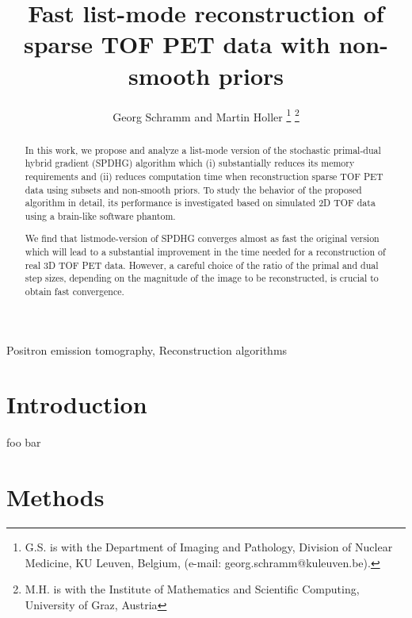 \documentclass{IEEEtran}
\begin{document}
\title{Fast list-mode reconstruction of sparse TOF PET data with non-smooth priors} 
\author{Georg Schramm and Martin Holler
\thanks{G.S. is with the Department of Imaging and Pathology, Division of Nuclear Medicine,
KU Leuven, Belgium, (e-mail: georg.schramm@kuleuven.be).}
\thanks{M.H. is with the Institute of Mathematics and Scientific Computing, 
University of Graz, Austria}
}

\maketitle

\begin{abstract}
In this work, we propose and analyze a list-mode version of the stochastic primal-dual hybrid gradient
(SPDHG) algorithm which (i) substantially reduces its memory requirements and (ii) reduces
computation time when reconstruction sparse TOF PET data using subsets and non-smooth priors. 
To study the behavior of the proposed algorithm in detail, its performance 
is investigated based on simulated 2D TOF data using a brain-like software phantom.

We find that listmode-version of SPDHG converges almost as fast the original version
which will lead to a substantial improvement in the time needed for a reconstruction
of real 3D TOF PET data.
However, a careful choice of the ratio of the primal and dual step sizes, 
depending on the magnitude of the image to be reconstructed, is crucial to obtain fast convergence.
\end{abstract}

\begin{IEEEkeywords}
Positron emission tomography, Reconstruction algorithms
\end{IEEEkeywords}

\section{Introduction}
foo bar

\section{Methods}
\end{document}
